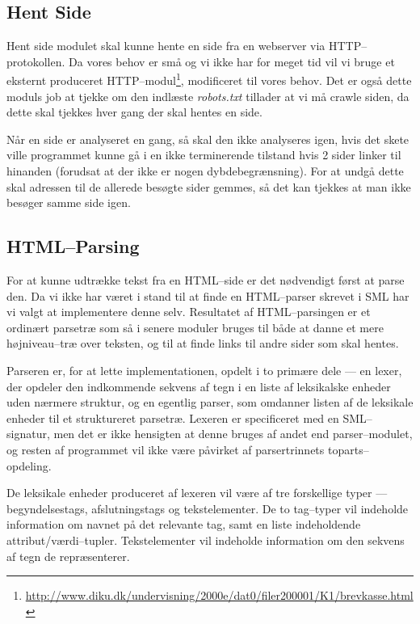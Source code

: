 \documentclass[a4paper,oneside]{memoir}
\begin{document}
\subsection{Hent Side}
\label{hentside}
Hent side modulet skal kunne hente en side fra en webserver via
HTTP--protokollen. Da vores behov er små og vi ikke har for meget tid
vil vi bruge et eksternt produceret
HTTP--modul\footnote{\url{http://www.diku.dk/undervisning/2000e/dat0/filer200001/K1/brevkasse.html}},
modificeret til vores behov. Det er også dette moduls job at tjekke om
den indlæste \textit{robots.txt} tillader at vi må crawle siden, da dette skal
tjekkes hver gang der skal hentes en side.

Når en side er analyseret en gang, så skal den ikke analyseres igen,
hvis det skete ville programmet kunne gå i en ikke terminerende
tilstand hvis 2 sider linker til hinanden (forudsat at der ikke er
nogen dybdebegrænsning). For at undgå dette skal adressen til de
allerede besøgte sider gemmes, så det kan tjekkes at man ikke besøger
samme side igen.

\subsection{HTML--Parsing}
\label{htmlparsing}
For at kunne udtrække tekst fra en HTML--side er det nødvendigt først
at parse den. Da vi ikke har været i stand til at finde en HTML--parser
skrevet i SML har vi valgt at implementere denne selv. Resultatet af
HTML--parsingen er et ordinært parsetræ som så i senere moduler bruges
til både at danne et mere højniveau--træ over teksten, og til at finde
links til andre sider som skal hentes.

Parseren er, for at lette implementationen, opdelt i to primære dele ---
en lexer, der opdeler den indkommende sekvens af tegn i en liste af
leksikalske enheder uden nærmere struktur, og en egentlig parser, som
omdanner listen af de leksikale enheder til et struktureret
parsetræ. Lexeren er specificeret med en SML--signatur, men det er ikke
hensigten at denne bruges af andet end parser--modulet, og resten af
programmet vil ikke være påvirket af parsertrinnets toparts--opdeling.

De leksikale enheder produceret af lexeren vil være af tre forskellige
typer --- begyndelsestags, afslutningstags og tekstelementer. De to
tag--typer vil indeholde information om navnet på det relevante tag,
samt en liste indeholdende attribut/værdi--tupler. Tekstelementer vil
indeholde information om den sekvens af tegn de repræsenterer.
\end{document}
